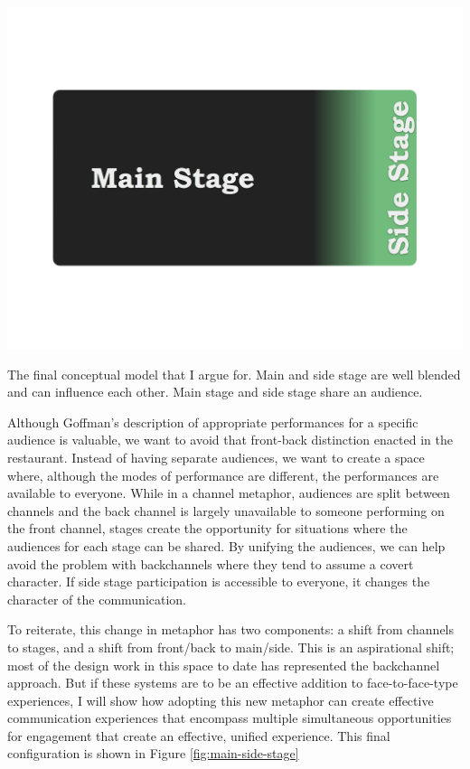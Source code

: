 \begin{marginfigure}
	\includegraphics{figures/main-side-final.png}
	\caption{The final conceptual model that I argue for. Main and side stage are well blended and can influence each other. Main stage and side stage share an audience.}
	\label{fig:main-side-stage}
\end{marginfigure}


Although Goffman's description of appropriate performances for a specific audience is valuable, we want to avoid that front-back distinction enacted in the restaurant. Instead of having separate audiences, we want to create a space where, although the modes of performance are different, the performances are available to everyone. While in a channel metaphor, audiences are split between channels and the back channel is largely unavailable to someone performing on the front channel, stages create the opportunity for situations where the audiences for each stage can be shared. By unifying the audiences, we can help avoid the problem with backchannels where they tend to assume a covert character. If side stage participation is accessible to everyone, it changes the character of the communication.

To reiterate, this change in metaphor has two components: a shift from channels to stages, and a shift from front/back to main/side. This is an aspirational shift; most of the design work in this space to date has represented the backchannel approach. But if these systems are to be an effective addition to face-to-face-type experiences, I will show how adopting this new metaphor can create effective communication experiences that encompass multiple simultaneous opportunities for engagement that create an effective, unified experience. This final configuration is shown in Figure \ref{fig:main-side-stage}

